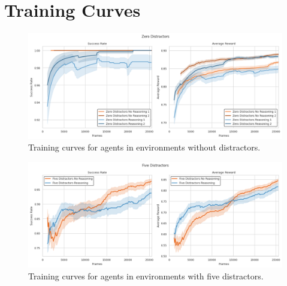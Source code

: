 \documentclass[11pt,a4paper]{article}
\begin{document}
\newpage
\section{Training Curves}
\label{appendix: training-curves}
\begin{figure}[htbp]
    \centering
    \includegraphics[width=\textwidth]{../images/zero_distractors_training_curves.png}
    \caption{Training curves for agents in environments without distractors.}
    \label{fig:no_distractors}
\end{figure}
\begin{figure}[htbp]
    \centering
    \includegraphics[width=\textwidth]{../images/five_distractors_training_curves.png}
    \caption{Training curves for agents in environments with five distractors.}
    \label{fig:five_distractors}
\end{figure}


\newpage
\end{document}
